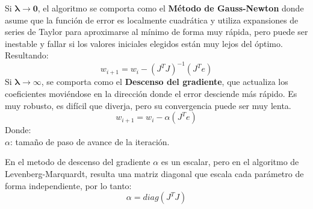 \noindent Si $\boldsymbol{\lambda \rightarrow 0}$, el algoritmo se comporta como el \textbf{Método de Gauss-Newton} donde asume que la función de error es localmente cuadrática y utiliza expansiones de series de Taylor para aproximarse al mínimo de forma muy rápida, pero puede ser inestable y fallar si los valores iniciales elegidos están muy lejos del óptimo. Resultando:
\begin{equation}
    w_{i+1} = w_i - \left( J^T J \right)^{-1} (J^T e)
\end{equation}
Si $\boldsymbol{\lambda \rightarrow \infty}$, se comporta como el \textbf{Descenso del gradiente}, que  actualiza los coeficientes moviéndose en la dirección donde el error desciende más rápido. Es muy robusto, es difícil que diverja, pero su convergencia puede ser muy lenta.
\begin{equation}
    w_{i+1} = w_i - \alpha (J^T e)
\end{equation}
Donde:\\
$\alpha$: tamaño de paso de avance de la iteración.

En el metodo de descenso del gradiente $\alpha$ es un escalar, pero en el algoritmo de Levenberg-Marquardt, resulta una matriz diagonal que escala cada parámetro de forma independiente, por lo tanto:
\begin{equation}
    \alpha = diag(J^T J)
\end{equation}

